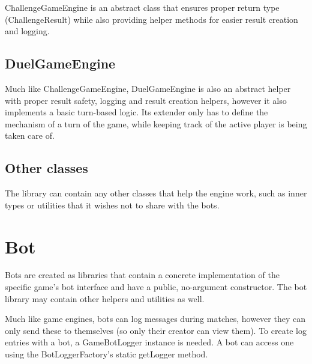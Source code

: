 		ChallengeGameEngine is an abstract class that ensures proper return type (ChallengeResult) while also providing helper methods for easier result creation and logging.
		
		\subsection*{DuelGameEngine}
		
		Much like ChallengeGameEngine, DuelGameEngine is also an abstract helper with proper result safety, logging and result creation helpers, however it also implements a basic turn-based logic. Its extender only has to define the mechanism of a turn of the game, while keeping track of the active player is being taken care of.
		
		\subsection*{Other classes}
		
		The library can contain any other classes that help the engine work, such as inner types or utilities that it wishes not to share with the bots.

	\section{Bot}
	
	Bots are created as libraries that contain a concrete implementation of the specific game's bot interface and have a public, no-argument constructor. The bot library may contain other helpers and utilities as well.

	Much like game engines, bots can log messages during matches, however they can only send these to themselves (so only their creator can view them). To create log entries with a bot, a GameBotLogger instance is needed. A bot can access one using the BotLoggerFactory's static getLogger method.

%






